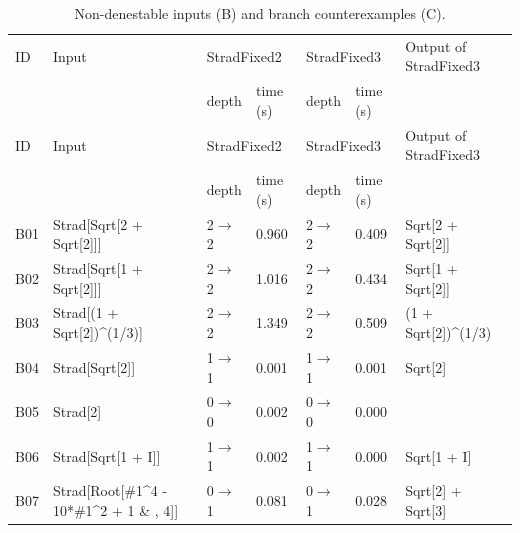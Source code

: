 \begin{longtable}{@{}p{}>{\ttfamily\footnotesize\raggedright\arraybackslash}p{}p{}p{}p{}p{}>{\ttfamily\footnotesize\raggedright\arraybackslash}p{}@{}}
\caption{Non-denestable inputs (B) and branch counterexamples (C).}\label{tab:cmpBC}\\
\toprule ID & Input & \multicolumn{2}{l}{StradFixed2} & \multicolumn{2}{l}{StradFixed3} & Output of StradFixed3\\ & & depth & time (s) & depth & time (s) & \\\midrule\endfirsthead
\toprule ID & Input & \multicolumn{2}{l}{StradFixed2} & \multicolumn{2}{l}{StradFixed3} & Output of StradFixed3\\ & & depth & time (s) & depth & time (s) & \\\midrule\endhead
\bottomrule\endfoot
B01 & Strad[\allowbreak{}Sqrt[\allowbreak{}2 +\allowbreak{} Sqrt[\allowbreak{}2]\allowbreak{}]\allowbreak{}]\allowbreak{} & 2$\to$2 & 0.960 & 2$\to$2 & 0.409 & Sqrt[\allowbreak{}2 +\allowbreak{} Sqrt[\allowbreak{}2]\allowbreak{}]\allowbreak{}\\
B02 & Strad[\allowbreak{}Sqrt[\allowbreak{}1 +\allowbreak{} Sqrt[\allowbreak{}2]\allowbreak{}]\allowbreak{}]\allowbreak{} & 2$\to$2 & 1.016 & 2$\to$2 & 0.434 & Sqrt[\allowbreak{}1 +\allowbreak{} Sqrt[\allowbreak{}2]\allowbreak{}]\allowbreak{}\\
B03 & Strad[\allowbreak{}(\allowbreak{}1 +\allowbreak{} Sqrt[\allowbreak{}2]\allowbreak{})\allowbreak{}\textasciicircum{}\allowbreak{}(\allowbreak{}1/\allowbreak{}3)\allowbreak{}]\allowbreak{} & 2$\to$2 & 1.349 & 2$\to$2 & 0.509 & (\allowbreak{}1 +\allowbreak{} Sqrt[\allowbreak{}2]\allowbreak{})\allowbreak{}\textasciicircum{}\allowbreak{}(\allowbreak{}1/\allowbreak{}3)\allowbreak{}\\
B04 & Strad[\allowbreak{}Sqrt[\allowbreak{}2]\allowbreak{}]\allowbreak{} & 1$\to$1 & 0.001 & 1$\to$1 & 0.001 & Sqrt[\allowbreak{}2]\allowbreak{}\\
B05 & Strad[\allowbreak{}2]\allowbreak{} & 0$\to$0 & 0.002 & 0$\to$0 & 0.000 & 2\\
B06 & Strad[\allowbreak{}Sqrt[\allowbreak{}1 +\allowbreak{} I]\allowbreak{}]\allowbreak{} & 1$\to$1 & 0.002 & 1$\to$1 & 0.000 & Sqrt[\allowbreak{}1 +\allowbreak{} I]\allowbreak{}\\
B07 & Strad[\allowbreak{}Root[\allowbreak{}\#1\textasciicircum{}\allowbreak{}4 -\allowbreak{} 10*\allowbreak{}\#1\textasciicircum{}\allowbreak{}2 +\allowbreak{} 1 \& ,\allowbreak{} 4]\allowbreak{}]\allowbreak{} & 0$\to$1 & 0.081 & 0$\to$1 & 0.028 & Sqrt[\allowbreak{}2]\allowbreak{} +\allowbreak{} Sqrt[\allowbreak{}3]\allowbreak{}\\

\end{longtable}
